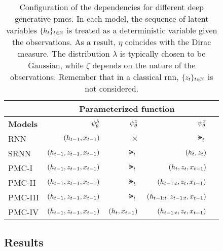 \begin{table}[!htpb]
    \begin{center}
    \small
    \begin{tabular}{|l|r|r|r|r|}
    \cline{2-4}
    \multicolumn{1}{l}{}             & \multicolumn{3}{|c|}{\textbf{Parameterized function}}                                     \\ \hline
        \multicolumn{1}{|l|}{\textbf{Models}} & \multicolumn{1}{r|}{$\psi^{h}_{\theta}$} & \multicolumn{1}{r|}{$\psi^{z}_{\theta}$} & $\psi^{x}_{\theta}$                 \\ \hline
    RNN    &  $(h_{t-1},x_{t-1})$ & $\times$ & $\lat_t$ \\ \hline
    SRNN    &  $(h_{t-1},z_{t-1},x_{t-1})$ & $\lat_t$ & $(h_t,z_t)$ \\ \hline
    PMC-I    & $(h_{t-1},z_{t-1},x_{t-1})$  & $\lat_t$   & $(h_t,z_t,x_{t-1})$  \\ \hline
    PMC-II  & $(h_{t-1},z_{t-1},x_{t-1})$  &$\lat_t$ &  $(h_{t-1:t},z_{t},x_{t-1})$  \\ \hline
    PMC-III &  $(h_{t-1},z_{t-1},x_{t-1})$  & $\lat_t$  &  $(h_{t-1:t},z_{t-1:t},x_{t-1})$ \\ \hline
    PMC-IV &  $(h_{t-1},z_{t-1},x_{t-1})$  & $(h_t,x_{t-1})$  & $(h_{t-1:t},z_{t},x_{t-1})$ \\ \hline
    \end{tabular}
    \end{center}
    \caption{Configuration of the dependencies for different deep generative \gls*{pmc}s. 
    In each model, the sequence of latent variables $\{h_t\}_{t \in \mathbb{N}}$ 
    is treated as a deterministic variable given the observations. As a result, 
    $\eta$ coincides with the Dirac measure. The distribution $\lambda$ 
    is typically chosen to be Gaussian,
    while $\zeta$ depends on the nature of the observations. 
    Remember that in a classical \gls*{rnn}, $\{z_t\}_{t \in \mathbb{N}}$ 
    is not considered.}
    \label{tab:config-pmc} 
\end{table}


\subsection{Results}

